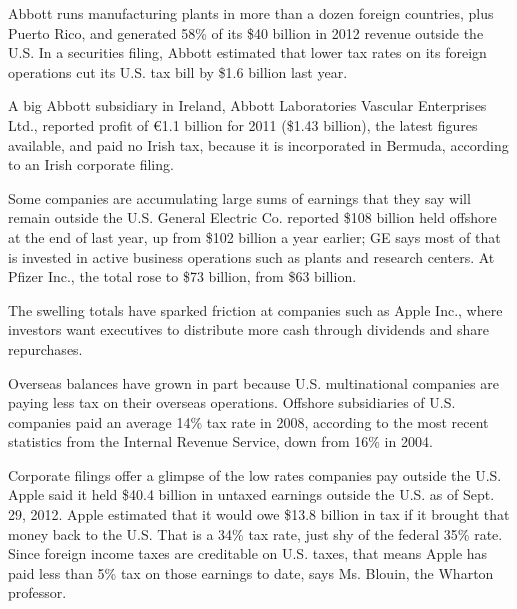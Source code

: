 \begin{select}
Abbott runs manufacturing plants in more than a dozen foreign countries, plus Puerto Rico, and generated 58\% of its \$40 billion in 2012 revenue outside the U.S. In a securities filing, Abbott estimated that lower tax rates on its foreign operations cut its U.S. tax bill by \$1.6 billion last year.

A big Abbott subsidiary in Ireland, Abbott Laboratories Vascular Enterprises Ltd., reported profit of \euro 1.1 billion for 2011 (\$1.43 billion), the latest figures available, and paid no Irish tax, because it is incorporated in Bermuda, according to an Irish corporate filing.

Some companies are accumulating large sums of earnings that they say will remain outside the U.S. General Electric Co. reported \$108 billion held offshore at the end of last year, up from \$102 billion a year earlier; GE says most of that is invested in active business operations such as plants and research centers. At Pfizer Inc., the total rose to \$73 billion, from \$63 billion.

The swelling totals have sparked friction at companies such as Apple Inc., where investors want executives to distribute more cash through dividends and share repurchases.

Overseas balances have grown in part because U.S. multinational companies are paying less tax on their overseas operations. Offshore subsidiaries of U.S. companies paid an average 14\% tax rate in 2008, according to the most recent statistics from the Internal Revenue Service, down from 16\% in 2004.

Corporate filings offer a glimpse of the low rates companies pay outside the U.S. Apple said it held \$40.4 billion in untaxed earnings outside the U.S. as of Sept. 29, 2012. Apple estimated that it would owe \$13.8 billion in tax if it brought that money back to the U.S. That is a 34\% tax rate, just shy of the federal 35\% rate. Since foreign income taxes are creditable on U.S. taxes, that means Apple has paid less than 5\% tax on those earnings to date, says Ms. Blouin, the Wharton professor.
\end{select} 


